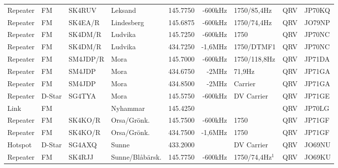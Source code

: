 \begin{landscape}
\begin{longtable}{llllrrlcl}
	Repeater           & FM           & SK4RUV        & Leksand             &          145.7750 &        -600kHz & 1750/85,4Hz     &       QRV       & JP70KQ           \\
	Repeater           & FM           & SK4EA/R       & Lindesberg          &          145.6875 &        -600kHz & 1750/74,4Hz     &       QRV       & JO79NP           \\
	Repeater           & FM           & SK4DM/R       & Ludvika             &          145.7250 &        -600kHz & 1750            &       QRV       & JP70NC           \\
	Repeater           & FM           & SK4DM/R       & Ludvika             &          434.7250 &        -1,6MHz & 1750/DTMF1      &       QRV       & JP70NC           \\
	Repeater           & FM           & SM4JDP/R      & Mora                &          145.7000 &        -600kHz & 1750/118,8Hz    &       QRV       & JP71DA           \\
	Repeater           & FM           & SM4JDP        & Mora                &          434.6750 &          -2MHz & 71,9Hz          &       QRV       & JP71GA           \\
	Repeater           & FM           & SM4JDP        & Mora                &          434.8500 &          -2MHz & Carrier         &       QRV       & JP71GA           \\
	Repeater           & D-Star       & SG4TYA        & Mora                &          145.5750 &        -600kHz & DV Carrier      &       QRV       & JP71GE           \\
	Link               & FM           &               & Nyhammar            &          145.4250 &                &                 &       QRV       & JP70LG           \\
	Repeater           & FM           & SK4KO/R       & Orsa/Grönk.         &          145.7500 &        -600kHz & 1750            &       QRV       & JP71GF           \\
	Repeater           & FM           & SK4KO/R       & Orsa/Grönk.         &          434.7500 &        -1,6MHz & 1750            &       QRV       & JP71GF           \\
	Hotspot            & D-Star       & SG4AXQ        & Sunne               &          433.2000 &                & DV Carrier      &       QRV       & JO69NU           \\
	Repeater           & FM           & SK4RJJ        & Sunne/Blåbärsk.     &          145.7750 &        -600kHz & 1750/74,4Hz$^1$ &       QRV       & JO69KU           \\

\end{longtable}
\end{landscape}

